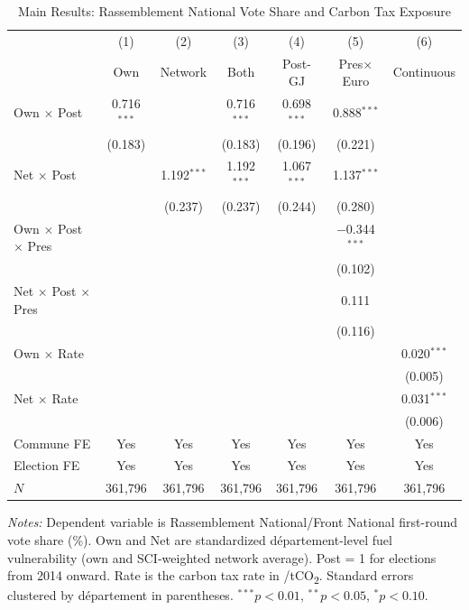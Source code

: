 \documentclass[12pt]{article}
\providecommand{\euro}{\texteuro}
\newcommand{\rn}{Rassemblement National}
\newcommand{\fn}{Front National}
\newcommand{\dept}{d\'{e}partement}
\begin{document}
\begin{table}[H]
\centering
\caption{Main Results: \rn{} Vote Share and Carbon Tax Exposure}
\label{tab:main}
\begin{threeparttable}
\begin{tabular}{@{}lcccccc@{}}
\toprule
 & (1) & (2) & (3) & (4) & (5) & (6) \\
 & Own & Network & Both & Post-GJ & Pres$\times$Euro & Continuous \\
\midrule
Own $\times$ Post & 0.716$^{***}$ & & 0.716$^{***}$ & 0.698$^{***}$ & 0.888$^{***}$ & \\
 & (0.183) & & (0.183) & (0.196) & (0.221) & \\[3pt]
Net $\times$ Post & & 1.192$^{***}$ & 1.192$^{***}$ & 1.067$^{***}$ & 1.137$^{***}$ & \\
 & & (0.237) & (0.237) & (0.244) & (0.280) & \\[3pt]
Own $\times$ Post $\times$ Pres & & & & & $-$0.344$^{***}$ & \\
 & & & & & (0.102) & \\[3pt]
Net $\times$ Post $\times$ Pres & & & & & 0.111 & \\
 & & & & & (0.116) & \\[3pt]
Own $\times$ Rate & & & & & & 0.020$^{***}$ \\
 & & & & & & (0.005) \\[3pt]
Net $\times$ Rate & & & & & & 0.031$^{***}$ \\
 & & & & & & (0.006) \\[3pt]
\midrule
Commune FE & Yes & Yes & Yes & Yes & Yes & Yes \\
Election FE & Yes & Yes & Yes & Yes & Yes & Yes \\
$N$ & 361,796 & 361,796 & 361,796 & 361,796 & 361,796 & 361,796 \\
\bottomrule
\end{tabular}
\begin{tablenotes}
\small
\item \textit{Notes:} Dependent variable is \rn{}/\fn{} first-round vote share (\%). Own and Net are standardized \dept{}-level fuel vulnerability (own and SCI-weighted network average). Post = 1 for elections from 2014 onward. Rate is the carbon tax rate in \euro/tCO\textsubscript{2}. Standard errors clustered by \dept{} in parentheses. $^{***}p<0.01$, $^{**}p<0.05$, $^{*}p<0.10$.
\end{tablenotes}
\end{threeparttable}
\end{table}
\end{document}
